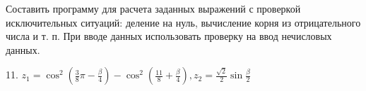 Составить программу для расчета заданных выражений с проверкой 
исключительных ситуаций: деление на нуль, вычисление корня из отрицательного
числа и т. п. При вводе данных использовать проверку на ввод нечисловых
данных.

11.
$ 
	z_1 = \cos^2{(\frac{3}{8}\pi - \frac{\beta}{4})} - \cos^2{(\frac{11}{8} + \frac{\beta}{4})},
	z_2 = \frac{\sqrt{2}}{2}\sin{\frac{\beta}{2}}
$
